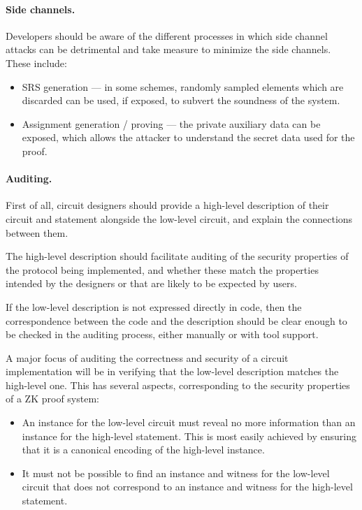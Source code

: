 \paragraph{Side channels.}
Developers should be aware of the different processes in which side channel attacks can be detrimental and take measure to minimize the side channels. These include:
\begin{itemize}[label={- }]
    \item SRS generation --- in some schemes, randomly sampled elements which are discarded can be used, if exposed, to subvert the soundness of the system.
    \item Assignment generation / proving --- the private auxiliary data can be exposed, which allows the attacker to understand the secret data used for the proof.
\end{itemize}


\paragraph{Auditing.}

First of all, circuit designers should provide a high-level description of their circuit and statement
alongside the low-level circuit, and explain the connections between them.             

The high-level description should facilitate auditing of the security properties of the protocol
being implemented, and whether these match the properties intended by the designers or that are likely to be expected by users.

If the low-level description is not expressed directly in code, then the correspondence between the code and the description should be clear enough to be checked in the auditing process, either manually or with tool support.

A major focus of auditing the correctness and security of a circuit implementation will be in verifying that the low-level description matches the high-level one. This has several aspects, corresponding to the security properties of a ZK proof system:
\begin{itemize}
    \item An instance for the low-level circuit must reveal no more information than an instance for the high-level statement. This is most easily achieved by ensuring that it is a canonical encoding of the high-level instance.
    \item It must not be possible to find an instance and witness for the low-level circuit that does not correspond to an instance and witness for the high-level statement.
\end{itemize}

